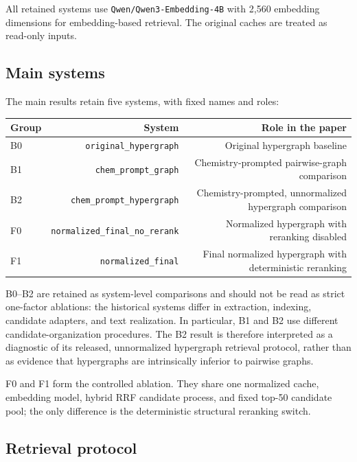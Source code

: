 All retained systems use \texttt{Qwen/Qwen3-Embedding-4B} with 2,560 embedding dimensions for embedding-based retrieval. The original caches are treated as read-only inputs.

\subsection{Main systems}

The main results retain five systems, with fixed names and roles:

\begin{table}[t]
\centering
\small
\begin{tabularx}{\linewidth}{Xrr}
\toprule
Group & System & Role in the paper \\
\midrule
B0 & \texttt{original\_hypergraph} & Original hypergraph baseline \\
B1 & \texttt{chem\_prompt\_graph} & Chemistry-prompted pairwise-graph comparison \\
B2 & \texttt{chem\_prompt\_hypergraph} & Chemistry-prompted, unnormalized hypergraph comparison \\
F0 & \texttt{normalized\_final\_no\_rerank} & Normalized hypergraph with reranking disabled \\
F1 & \texttt{normalized\_final} & Final normalized hypergraph with deterministic reranking \\
\bottomrule
\end{tabularx}
\end{table}

B0--B2 are retained as system-level comparisons and should not be read as strict one-factor ablations: the historical systems differ in extraction, indexing, candidate adapters, and text realization. In particular, B1 and B2 use different candidate-organization procedures. The B2 result is therefore interpreted as a diagnostic of its released, unnormalized hypergraph retrieval protocol, rather than as evidence that hypergraphs are intrinsically inferior to pairwise graphs.

F0 and F1 form the controlled ablation. They share one normalized cache, embedding model, hybrid RRF candidate process, and fixed top-50 candidate pool; the only difference is the deterministic structural reranking switch.

\subsection{Retrieval protocol}

